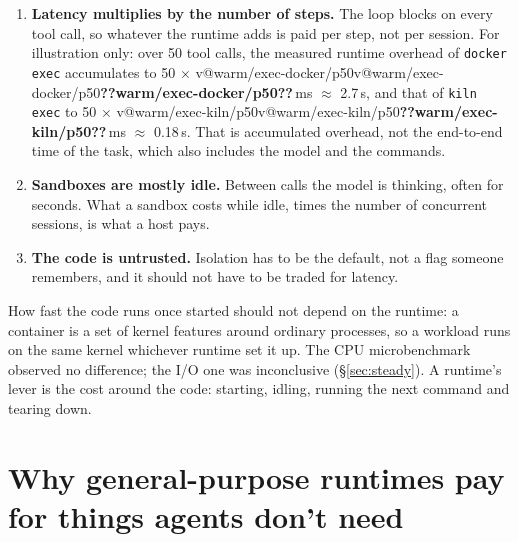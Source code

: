 \documentclass[10pt,letterpaper]{article}
\makeatletter
\newcommand{\code}[1]{\texttt{#1}}
\newcommand{\V}[1]{\ifcsname v@#1\endcsname\csname v@#1\endcsname\else\textbf{??#1??}\fi}
\newcommand{\ms}[1]{\V{#1}\,ms}
\makeatother
\begin{document}
\begin{enumerate}
\item \textbf{Latency multiplies by the number of steps.} The loop blocks on
every tool call, so whatever the runtime adds is paid per step, not per session.
For illustration only: over 50 tool calls, the measured runtime overhead of
\code{docker exec} accumulates to 50 $\times$ \ms{warm/exec-docker/p50}
$\approx$ 2.7\,s, and that of \code{kiln exec} to 50 $\times$
\ms{warm/exec-kiln/p50} $\approx$ 0.18\,s. That is accumulated overhead, not the
end-to-end time of the task, which also includes the model and the commands.
\item \textbf{Sandboxes are mostly idle.} Between calls the model is thinking,
often for seconds. What a sandbox costs while idle, times the number of
concurrent sessions, is what a host pays.
\item \textbf{The code is untrusted.} Isolation has to be the default, not a
flag someone remembers, and it should not have to be traded for latency.
\end{enumerate}

How fast the code runs once started should not depend on the runtime: a
container is a set of kernel features around ordinary processes, so a workload
runs on the same kernel whichever runtime set it up. The CPU microbenchmark
observed no difference; the I/O one was inconclusive (\S\ref{sec:steady}). A
runtime's lever is the cost around the code: starting, idling, running the next
command and tearing down.

\section{Why general-purpose runtimes pay for things agents don't need}
\end{document}
